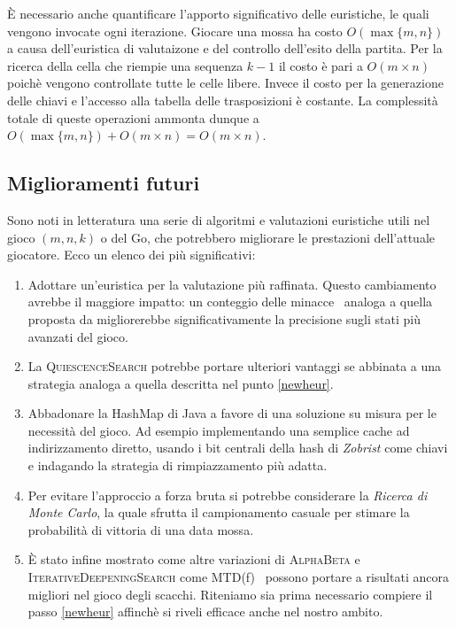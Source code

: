 \documentclass{article}
\begin{document}
\`E necessario anche quantificare l'apporto significativo delle euristiche,
le quali vengono invocate ogni iterazione. Giocare una mossa ha costo
$O(\max\{m, n\})$ a causa dell'euristica di valutaizone e del controllo
dell'esito della partita. Per la ricerca della cella che riempie una sequenza
$k-1$ il costo \`e pari a $O(m \times n)$ poich\`e vengono controllate tutte le celle libere.
Invece il costo per la generazione delle chiavi e l'accesso alla tabella delle
trasposizioni \`e costante. La complessit\`a totale di queste operazioni
ammonta dunque a $O(\max\{m,n\}) + O(m \times n) = O(m \times n)$.
\subsection{Miglioramenti futuri}

Sono noti in letteratura una serie di algoritmi e valutazioni euristiche utili
nel gioco $(m, n, k)$ o del Go, che potrebbero migliorare le prestazioni
dell'attuale giocatore. Ecco un elenco dei pi\`u significativi:
\begin{enumerate}
  \item Adottare un'euristica per la valutazione pi\`u raffinata. Questo cambiamento
    avrebbe il maggiore impatto: un conteggio delle minacce~\cite{heur}
    analoga a quella proposta da \citeauthor{heur} migliorerebbe significativamente
    la precisione sugli stati pi\`u avanzati del gioco. \label{newheur}
  \item La \textsc{QuiescenceSearch} potrebbe portare ulteriori vantaggi se
    abbinata a una strategia analoga a quella descritta nel punto \vref{newheur}.
  \item Abbadonare la HashMap di Java a favore di una soluzione su misura
    per le necessit\`a del gioco. Ad esempio implementando una semplice cache
    ad indirizzamento diretto, usando i bit centrali della hash di \emph{Zobrist}
    come chiavi e indagando la strategia di rimpiazzamento pi\`u adatta.
  \item Per evitare l'approccio a forza bruta si potrebbe considerare
    la \emph{Ricerca di Monte Carlo}, la quale sfrutta il campionamento casuale
    per stimare la probabilit\`a di vittoria di una data mossa.
  \item \`E stato infine mostrato come altre variazioni di \textsc{AlphaBeta} e
    \textsc{IterativeDeepeningSearch} come MTD(f)~\cite{mtdf} possono portare a
    risultati ancora migliori nel gioco degli scacchi. Riteniamo sia prima
    necessario compiere il passo \vref{newheur} affinch\`e si riveli efficace anche nel nostro ambito.
\end{enumerate}

\pagebreak


\end{document}
